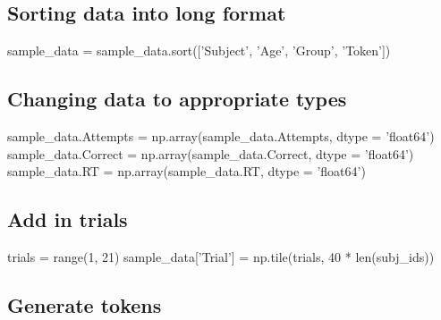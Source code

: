 \documentclass[]{article}
\newenvironment{Shaded}{\begin{snugshade}}{\end{snugshade}}
\newcommand{\DataTypeTok}[1]{\textcolor[rgb]{0.13,0.29,0.53}{{#1}}}
\newcommand{\DecValTok}[1]{\textcolor[rgb]{0.00,0.00,0.81}{{#1}}}
\newcommand{\StringTok}[1]{\textcolor[rgb]{0.31,0.60,0.02}{{#1}}}
\newcommand{\NormalTok}[1]{{#1}}
\begin{document}
\subsection{Sorting data into long
format}\label{sorting-data-into-long-format}

\begin{Shaded}
\begin{Highlighting}[]

\NormalTok{sample_data = sample_data.sort([}\StringTok{'Subject'}\NormalTok{, }\StringTok{'Age'}\NormalTok{, }\StringTok{'Group'}\NormalTok{, }\StringTok{'Token'}\NormalTok{])}
\end{Highlighting}
\end{Shaded}

\subsection{Changing data to appropriate
types}\label{changing-data-to-appropriate-types}

\begin{Shaded}
\begin{Highlighting}[]
\NormalTok{sample_data.Attempts = np.array(sample_data.Attempts, dtype = }\StringTok{'float64'}\NormalTok{)}
\NormalTok{sample_data.Correct = np.array(sample_data.Correct, dtype = }\StringTok{'float64'}\NormalTok{)}
\NormalTok{sample_data.RT = np.array(sample_data.RT, dtype = }\StringTok{'float64'}\NormalTok{)}
\end{Highlighting}
\end{Shaded}

\subsection{Add in trials}\label{add-in-trials}

\begin{Shaded}
\begin{Highlighting}[]
\NormalTok{trials = }\DataTypeTok{range}\NormalTok{(}\DecValTok{1}\NormalTok{, }\DecValTok{21}\NormalTok{)}
\NormalTok{sample_data[}\StringTok{'Trial'}\NormalTok{] = np.tile(trials, }\DecValTok{40} \NormalTok{* }\DataTypeTok{len}\NormalTok{(subj_ids))}
\end{Highlighting}
\end{Shaded}

\subsection{Generate tokens}\label{generate-tokens}
\end{document}
